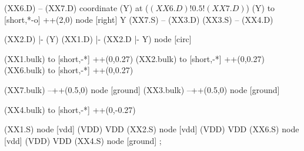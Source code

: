 \begin{circuitikz}[american]
	(XX6.D) -- (XX7.D) 
	coordinate (Y) at ($(XX6.D)!0.5!(XX7.D)$)
	(Y) to [short,*-o] ++(2,0) node [right] {Y}
	(XX7.S) -- (XX3.D)
	(XX3.S) -- (XX4.D)
	
	(XX2.D) |- (Y) 
	(XX1.D) |- (XX2.D |- Y) node [circ] {}
	
	(XX1.bulk) to [short,-*] ++(0,0.27)
	(XX2.bulk) to [short,-*] ++(0,0.27)
	(XX6.bulk) to [short,-*] ++(0,0.27)
	
	(XX7.bulk) --++(0.5,0) node [ground] {}
	(XX3.bulk) --++(0.5,0) node [ground] {}
	
	(XX4.bulk) to [short,-*] ++(0,-0.27)


	(XX1.S) node [vdd] (VDD) {VDD}
	(XX2.S) node [vdd] (VDD) {VDD}
	(XX6.S) node [vdd] (VDD) {VDD}
	(XX4.S) node [ground] {}
;

\end{circuitikz}
